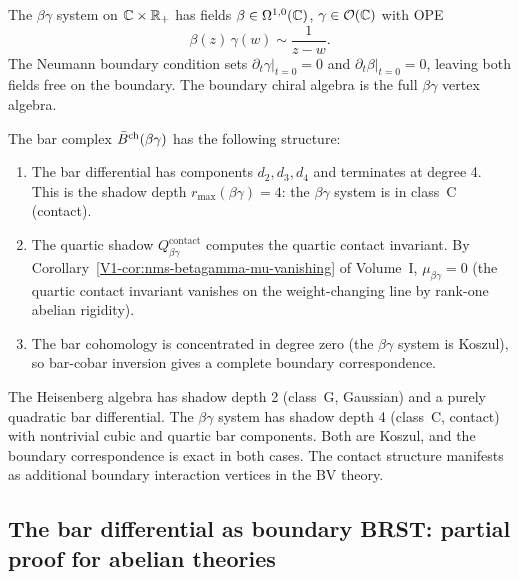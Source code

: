 \begin{construction}
The $\beta\gamma$ system on $\mathbb{C} \times \mathbb{R}_+$ has fields
$\beta \in \Omega^{1,0}(\mathbb{C})$, $\gamma \in \mathcal{O}(\mathbb{C})$ with OPE
\[
\beta(z) \, \gamma(w) \sim \frac{1}{z - w}.
\]
The Neumann boundary condition sets $\partial_t \gamma|_{t=0} = 0$ and
$\partial_t \beta|_{t=0} = 0$, leaving both fields free on the boundary.
The boundary chiral algebra is the full $\beta\gamma$ vertex algebra.

The bar complex $\bar{B}^{\mathrm{ch}}(\beta\gamma)$ has the following structure:
\begin{enumerate}
\item The bar differential has components $d_2, d_3, d_4$ and terminates
 at degree 4. This is the shadow depth $r_{\max}(\beta\gamma) = 4$:
 the $\beta\gamma$ system is in class~C (contact).
\item The quartic shadow $Q^{\mathrm{contact}}_{\beta\gamma}$ computes
 the quartic contact invariant. By
 Corollary~\ref*{V1-cor:nms-betagamma-mu-vanishing} of Volume~I,
 $\mu_{\beta\gamma} = 0$ (the quartic contact invariant vanishes on the
 weight-changing line by rank-one abelian rigidity).
\item The bar cohomology is concentrated in degree zero (the $\beta\gamma$
 system is Koszul), so bar-cobar inversion gives a complete boundary
 correspondence.
\end{enumerate}
\end{construction}

\begin{remark}
The Heisenberg algebra has shadow depth 2 (class~G, Gaussian) and a
purely quadratic bar differential. The $\beta\gamma$ system has shadow
depth 4 (class~C, contact) with nontrivial cubic
and quartic bar components. Both are
Koszul, and the boundary correspondence is exact in both cases. The
contact structure manifests as additional
boundary interaction vertices in the BV theory.
\end{remark}

\subsection{The bar differential as boundary BRST: partial proof for abelian theories}

